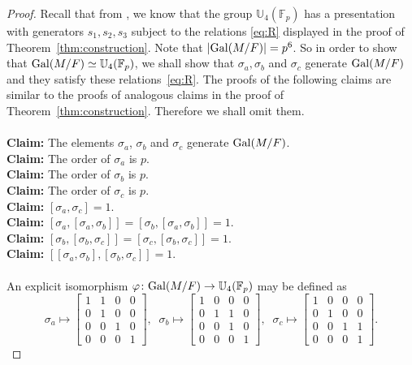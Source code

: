 \documentclass[12pt,leqno]{amsart}
\theoremstyle{plain}
\theoremstyle{definition}
\newcommand{\Gal}{{\rm Gal}}
\newcommand{\F}{{\mathbb F}}
\newcommand{\U}{{\mathbb U}}
\begin{document}
\begin{proof}
Recall that from \cite[Theorem 1]{BD}, we know that the group $\U_4(\F_p)$ has a presentation with generators $s_1,s_2,s_3$ subject to the  relations \eqref{eq:R} displayed in the proof of Theorem~\ref{thm:construction}.
Note that  $|\Gal(M/F)|=p^6$.
So in order to show that $\Gal(M/F)\simeq \U_4(\F_p)$, we shall show that $\sigma_a,\sigma_b$ and $\sigma_c$ generate $\Gal(M/F)$ and they satisfy these relations~\eqref{eq:R}.
 The proofs of the following claims are similar to the proofs of analogous claims in the proof of Theorem~\ref{thm:construction}. Therefore we shall omit them.
\\
\\
{\bf Claim:} The elements $\sigma_a$, $\sigma_b$ and $\sigma_c$ generate $\Gal(M/F)$.\\
{\bf Claim:} The order of $\sigma_a$ is $p$.\\
{\bf Claim:} The order of $\sigma_b$ is $p$.\\
{\bf Claim:} The order of $\sigma_c$ is $p$.\\
{\bf Claim:} $[\sigma_a,\sigma_c]=1$.\\
{\bf Claim:} $[\sigma_a,[\sigma_a,\sigma_b]]=[\sigma_b,[\sigma_a,\sigma_b]]=1$.\\
{\bf Claim:} $[\sigma_b,[\sigma_b,\sigma_c]]=[\sigma_c,[\sigma_b,\sigma_c]]=1$.\\
{\bf Claim:} $[[\sigma_a,\sigma_b],[\sigma_b,\sigma_c]]=1$.\\
\\
  An explicit isomorphism $\varphi\colon {\rm Gal}(M/F)\to \U_4(\F_p)$ may be defined as
\[
\sigma_a \mapsto \begin{bmatrix}
1& 1 & 0 & 0\\
0& 1 & 0 & 0\\
0& 0 & 1 & 0\\
0& 0 & 0 & 1
\end{bmatrix}, \; \;
\sigma_b\mapsto  \begin{bmatrix}
1& 0 & 0 & 0\\
0& 1 & 1 & 0\\
0& 0 & 1 & 0\\
0& 0 & 0 & 1
\end{bmatrix}, \;\;
 \sigma_c\mapsto \begin{bmatrix}
1& 0 & 0 & 0\\
0& 1 & 0 & 0\\
0& 0 & 1 & 1\\
0& 0 & 0 & 1
\end{bmatrix}.
\]

\end{proof}
\end{document}
